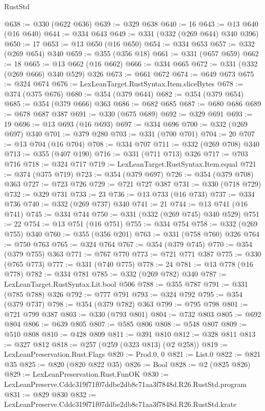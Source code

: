 \begin{lexlean}{RustStd}
\begin{coremodule}
@638 := @330 (@622 @636)
@639 := @329 @638
@640 := 16
@643 := @13 @640 (@16 @640)
@644 := @334 @643
@649 := @331 (@332 (@269 @644) @340 @396)
@650 := 17
@653 := @13 @650 (@16 @650)
@654 := @334 @653
@657 := @332 (@269 @654) @340
@659 := @355 (@356 @18)
@661 := @331 (@657 @659)
@662 := 18
@665 := @13 @662 (@16 @662)
@666 := @334 @665
@672 := @331 (@332 (@269 @666) @340 @529) @326
@673 := @661 @672
@674 := @649 @673
@675 := @324 @674
@676 := LexLeanTarget.RustSyntax.Item.sliceBytes
@678 := @374 (@375 @676)
@680 := @354 (@379 @644)
@682 := @354 (@379 @654)
@685 := @354 (@379 @666) @363
@686 := @682 @685
@687 := @680 @686
@689 := @678 @687 @387
@691 := @330 (@675 @689)
@692 := @329 @691
@693 := 19
@696 := @13 @693 (@16 @693)
@697 := @334 @696
@700 := @332 (@269 @697) @340
@701 := @379 @280
@703 := @331 (@700 @701)
@704 := 20
@707 := @13 @704 (@16 @704)
@708 := @334 @707
@711 := @332 (@269 @708) @340
@713 := @355 (@407 @190)
@716 := @331 (@711 @713) @326
@717 := @703 @716
@718 := @324 @717
@719 := LexLeanTarget.RustSyntax.Item.equal
@721 := @374 (@375 @719)
@723 := @354 (@379 @697)
@726 := @354 (@379 @708) @363
@727 := @723 @726
@729 := @721 @727 @387
@731 := @330 (@718 @729)
@732 := @329 @731
@733 := 23
@736 := @13 @733 (@16 @733)
@737 := @334 @736
@740 := @332 (@269 @737) @340
@741 := 21
@744 := @13 @741 (@16 @741)
@745 := @334 @744
@750 := @331 (@332 (@269 @745) @340 @529)
@751 := 22
@754 := @13 @751 (@16 @751)
@755 := @334 @754
@758 := @332 (@269 @755) @340
@760 := @355 (@356 @201)
@763 := @331 (@758 @760) @326
@764 := @750 @763
@765 := @324 @764
@767 := @354 (@379 @745)
@770 := @354 (@379 @755) @363
@771 := @767 @770
@773 := @721 @771 @387
@775 := @330 (@765 @773)
@777 := @331 (@740 @775)
@778 := 24
@781 := @13 @778 (@16 @778)
@782 := @334 @781
@785 := @332 (@269 @782) @340
@787 := LexLeanTarget.RustSyntax.Lit.bool @506
@788 := @355 @787
@791 := @331 (@785 @788) @326
@792 := @777 @791
@793 := @324 @792
@795 := @354 (@379 @737)
@798 := @354 (@379 @782) @363
@799 := @795 @798
@801 := @721 @799 @387
@803 := @330 (@793 @801)
@804 := @732 @803
@805 := @692 @804
@806 := @639 @805
@807 := @585 @806
@808 := @548 @807
@809 := @510 @808
@810 := @428 @809
@811 := @391 @810
@812 := @328 @811
@813 := @327 @812
@818 := @257 (@259 (@323 @813) (@2 @258))
@819 := LexLeanPreservation.Rust.Flags
@820 := Prod.{0, 0}
@821 := List.{0}
@822 := @821 @35
@825 := @820 (@820 @822 @35)
@826 := Bool
@828 := @2 (@825 @826)
@829 := LexLeanPreservation.Rust.FunOK
@830 := LexLeanPreserve.Cddc319f71f07ddbe2db8c71aa3f7848d.R26.RustStd.program
@831 := @829 @830
@832 := LexLeanPreserve.Cddc319f71f07ddbe2db8c71aa3f7848d.R26.RustStd.krate

\end{coremodule}
\end{lexlean}
